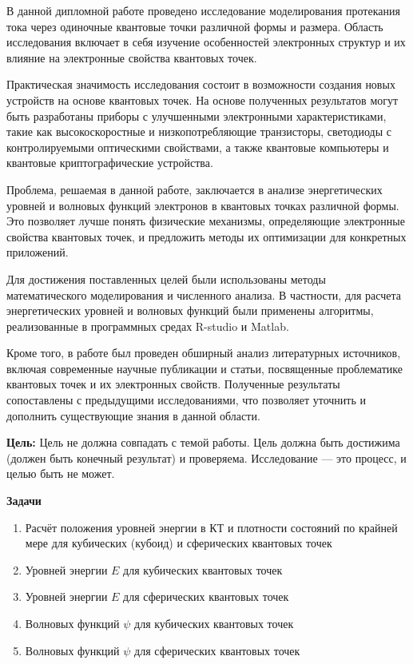 \documentclass[a4paper,14pt]{extarticle}
\begin{document}


\tableofcontents
\pagebreak


В данной дипломной работе проведено исследование моделирования протекания тока через одиночные квантовые точки различной формы и размера. Область исследования включает в себя изучение особенностей электронных структур и их влияние на электронные свойства квантовых точек.

Практическая значимость исследования состоит в возможности создания новых устройств на основе квантовых точек. На основе полученных результатов могут быть разработаны приборы с улучшенными электронными характеристиками, такие как высокоскоростные и низкопотребляющие транзисторы, светодиоды с контролируемыми оптическими свойствами, а также квантовые компьютеры и квантовые криптографические устройства.

Проблема, решаемая в данной работе, заключается в анализе энергетических уровней и волновых функций электронов в квантовых точках различной формы. Это позволяет лучше понять физические механизмы, определяющие электронные свойства квантовых точек, и предложить методы их оптимизации для конкретных приложений.

Для достижения поставленных целей были использованы методы математического моделирования и численного анализа. В частности, для расчета энергетических уровней и волновых функций были применены алгоритмы, реализованные в программных средах R-studio и Matlab.

Кроме того, в работе был проведен обширный анализ литературных источников, включая современные научные публикации и статьи, посвященные проблематике квантовых точек и их электронных свойств. Полученные результаты сопоставлены с предыдущими исследованиями, что позволяет уточнить и дополнить существующие знания в данной области.

\label{Tasks}

\textbf{Цель:} Цель не должна совпадать с темой работы. Цель должна быть достижима (должен быть конечный результат) и проверяема. Исследование --- это процесс, и целью быть не может.

\textbf{Задачи}
\begin{enumerate}
    \item Расчёт положения уровней энергии в КТ и плотности состояний по крайней мере для кубических (кубоид) и сферических квантовых точек
    \item Уровней энергии $E$ для кубических квантовых точек 
    \item Уровней энергии $E$ для сферических квантовых точек
    \item Волновых функций $\psi$ для кубических квантовых точек 
    \item Волновых функций $\psi$ для сферических квантовых точек
\end{enumerate}
\end{document}
